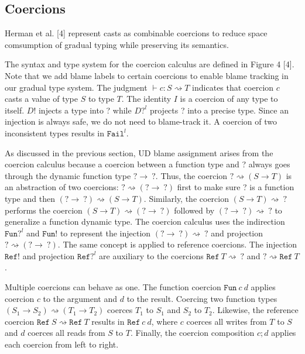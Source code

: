\subsection{Coercions}
Herman et al. [4] represent casts as combinable coercions to reduce 
space comsumption of gradual typing while preserving its semantics. 

The syntax and type system for the coercion calculus are defined in 
Figure 4 [4]. Note that we add blame labels to certain coercions to 
enable blame tracking in our gradual type system. The judgment $\vdash c: S 
\rightsquigarrow T$ indicates that coercion $c$ casts a value of type 
$S$ to type $T$. The identity $I$ is a coercion of any type to itself. 
$D!$ injects a type into ? while $D?^l$ projects ? into a precise type. 
Since an injection is always safe, we do not need to blame-track it. 
A coercion of two inconsistent types results in $\texttt{Fail}^l$. 

As discussed in the previous section, UD blame assignment arises  
from the coercion calculus because a coercion 
between a function type and ? always goes through the 
dynamic function type $? \rightarrow \: ?$. Thus,
the coercion $? \rightsquigarrow (S \rightarrow T)$ is an 
abstraction of two coercions: $? \rightsquigarrow 
(? \rightarrow \: ?)$ first to make sure ? is a function type 
and then $(? \rightarrow \: ?) \rightsquigarrow 
(S \rightarrow T)$. Similarly, the coercion $(S \rightarrow T) \rightsquigarrow \: ?$ 
performs the coercion $(S \rightarrow T) \rightsquigarrow (? \rightarrow \: ?)$ 
followed by $(? \rightarrow \: ?) \rightsquigarrow \: ?$ to 
generalize a function dynamic type.  
The coercion calculus uses the indirection $\texttt{Fun}?^l$ and $\texttt{Fun}!$ 
to represent the injection $(? \rightarrow \: ?) \rightsquigarrow \: ?$ and 
projection $? \rightsquigarrow (? \rightarrow \: ?)$. The same concept is 
applied to reference coercions. The injection $\texttt{Ref}!$ and 
projection $\texttt{Ref}?^l$ are auxiliary to the coercions $\texttt{Ref} \: T 
\rightsquigarrow \: ?$ and $? \rightsquigarrow \texttt{Ref} \: T$.

Multiple coercions can behave as one. The function coercion $\texttt{Fun} \: c \: d$ 
applies coercion $c$ to the argument and $d$ to the result. Coercing 
two function types $(S_1 \rightarrow S_2) \rightsquigarrow (T_1 \rightarrow T_2)$ 
coerces $T_1$ to $S_1$ and $S_2$ to $T_2$. Likewise, the reference coercion 
$\texttt{Ref} \: S \rightsquigarrow \texttt{Ref} \: T$ results in 
$\texttt{Ref} \: c \: d$, where $c$ coerces all writes from 
$T$ to $S$ and $d$ coerces all reads from $S$ to $T$. Finally, the coercion 
composition $c;d$ applies each coercion from left to right.

